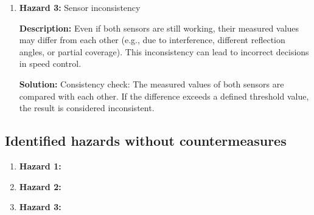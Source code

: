 \begin{enumerate}
        \paragraph{}
		\item \textbf{Hazard 3:} Sensor inconsistency
            
            \textbf{Description:} Even if both sensors are still working, their measured values may differ from each other (e.g., due to interference, different reflection angles, or partial coverage). This inconsistency can lead to incorrect decisions in speed control.
            
            \textbf{Solution:} Consistency check: The measured values of both sensors are compared with each other. If the difference exceeds a defined threshold value, the result is considered inconsistent.
        
        \paragraph{}
	\end{enumerate}
	
\subsection{Identified hazards without countermeasures }

	\begin{enumerate}
		\item \textbf{Hazard 1:} 
		\item \textbf{Hazard 2:}
		\item \textbf{Hazard 3:}
	\end{enumerate}